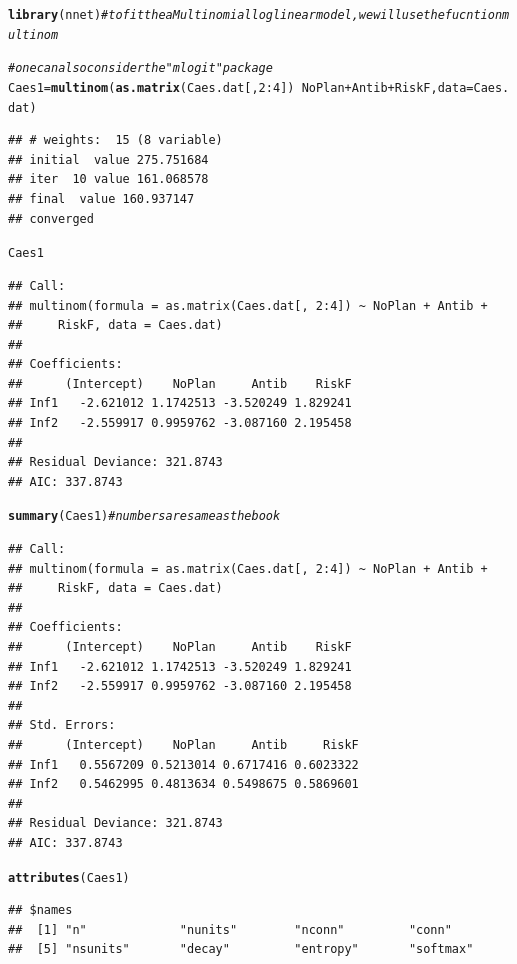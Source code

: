 \documentclass{article}\usepackage[]{graphicx}\usepackage[]{color}
\makeatletter
\newcommand{\hlnum}[1]{\textcolor[rgb]{0.686,0.059,0.569}{#1}}%
\newcommand{\hlcom}[1]{\textcolor[rgb]{0.678,0.584,0.686}{\textit{#1}}}%
\newcommand{\hlopt}[1]{\textcolor[rgb]{0,0,0}{#1}}%
\newcommand{\hlstd}[1]{\textcolor[rgb]{0.345,0.345,0.345}{#1}}%
\newcommand{\hlkwb}[1]{\textcolor[rgb]{0.69,0.353,0.396}{#1}}%
\newcommand{\hlkwc}[1]{\textcolor[rgb]{0.333,0.667,0.333}{#1}}%
\newcommand{\hlkwd}[1]{\textcolor[rgb]{0.737,0.353,0.396}{\textbf{#1}}}%
\newenvironment{kframe}{%
 \def\at@end@of@kframe{}%
 \ifinner\ifhmode%
  \def\at@end@of@kframe{\end{minipage}}%
  \begin{minipage}{\columnwidth}%
 \fi\fi%
 \def\FrameCommand##1{\hskip\@totalleftmargin \hskip-\fboxsep
 \colorbox{shadecolor}{##1}\hskip-\fboxsep
     \hskip-\linewidth \hskip-\@totalleftmargin \hskip\columnwidth}%
 \MakeFramed {\advance\hsize-\width
   \@totalleftmargin\z@ \linewidth\hsize
   \@setminipage}}%
 {\par\unskip\endMakeFramed%
 \at@end@of@kframe}
\newenvironment{knitrout}{}{} %
\makeatother
\begin{document}
\begin{knitrout}
\color{fgcolor}\begin{kframe}
\begin{alltt}
 \hlkwd{library}\hlstd{(nnet)}  \hlcom{# to fit the a Multinomial log linear model, we will use the fucntion multinom}

\hlcom{# one can also consider the "mlogit" package}
\hlstd{Caes1}\hlkwb{=}\hlkwd{multinom}\hlstd{(}\hlkwd{as.matrix}\hlstd{(Caes.dat[,}\hlnum{2}\hlopt{:}\hlnum{4}\hlstd{])}\hlopt{~}\hlstd{NoPlan}\hlopt{+}\hlstd{Antib}\hlopt{+}\hlstd{RiskF,}\hlkwc{data}\hlstd{=Caes.dat)}
\end{alltt}
\begin{verbatim}
## # weights:  15 (8 variable)
## initial  value 275.751684 
## iter  10 value 161.068578
## final  value 160.937147 
## converged
\end{verbatim}
\begin{alltt}
\hlstd{Caes1}
\end{alltt}
\begin{verbatim}
## Call:
## multinom(formula = as.matrix(Caes.dat[, 2:4]) ~ NoPlan + Antib + 
##     RiskF, data = Caes.dat)
## 
## Coefficients:
##      (Intercept)    NoPlan     Antib    RiskF
## Inf1   -2.621012 1.1742513 -3.520249 1.829241
## Inf2   -2.559917 0.9959762 -3.087160 2.195458
## 
## Residual Deviance: 321.8743 
## AIC: 337.8743
\end{verbatim}
\begin{alltt}
\hlkwd{summary}\hlstd{(Caes1)}  \hlcom{# numbers are same as the book}
\end{alltt}
\begin{verbatim}
## Call:
## multinom(formula = as.matrix(Caes.dat[, 2:4]) ~ NoPlan + Antib + 
##     RiskF, data = Caes.dat)
## 
## Coefficients:
##      (Intercept)    NoPlan     Antib    RiskF
## Inf1   -2.621012 1.1742513 -3.520249 1.829241
## Inf2   -2.559917 0.9959762 -3.087160 2.195458
## 
## Std. Errors:
##      (Intercept)    NoPlan     Antib     RiskF
## Inf1   0.5567209 0.5213014 0.6717416 0.6023322
## Inf2   0.5462995 0.4813634 0.5498675 0.5869601
## 
## Residual Deviance: 321.8743 
## AIC: 337.8743
\end{verbatim}
\begin{alltt}
\hlkwd{attributes}\hlstd{(Caes1)}
\end{alltt}
\begin{verbatim}
## $names
##  [1] "n"             "nunits"        "nconn"         "conn"         
##  [5] "nsunits"       "decay"         "entropy"       "softmax"      

\end{verbatim}
\end{kframe}
\end{knitrout}
\end{document}
